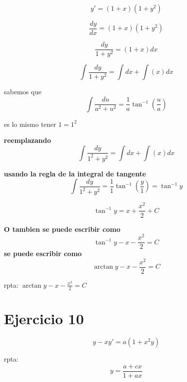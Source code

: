\documentclass[12pt,a4paper]{article}
\begin{document}
\begin{multicols}{2}
\[y\prime=(1+x)(1+y^2)\]

\[\frac{dy}{dx}=(1+x)(1+y^2)\]

\[\frac{dy}{1+y^2}=(1+x)dx\]

\[\int\frac{dy}{1+y^2}=\int dx + \int(x)dx\]



sabemos que 
\begin{equation*}
\int\frac{du}{a^2+u^2}=\frac{1}{a}\tan^{-1}\left(\frac{u}{a}\right)
\end{equation*}

es lo mismo tener $1=1^2 $

\textbf{reemplazando}
\[\int\frac{dy}{1^2+y^2}=\int dx + \int(x)dx\]

\textbf{usando la regla de la integral de tangente}
\[\int\frac{dy}{1^2+y^2}=\frac{1}{1}\tan^{-1}\left(\frac{y}{1}\right) = \tan^{-1}y\]

\[\tan^{-1}y=x+\frac{x^2}{2}+C\]

\textbf{O tambien se puede escribir como}
\[\tan^{-1}y - x - \frac{x^2}{2}=C\]
\textbf{se puede escribir como}
\[\arctan y - x - \frac{x^2}{2}=C\]


rpta: $\arctan y-x-\frac{x^2}{2}=C$

\section*{Ejercicio 10}

\[y- xy\prime=a(1+x^2y)\]

rpta: \[y=\frac{a+cx}{1+ax}\]

\end{multicols}
\end{document}

